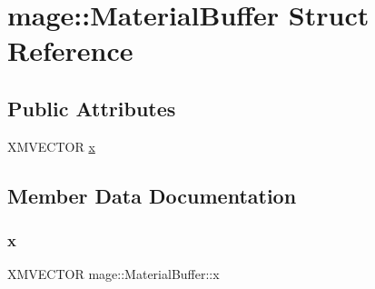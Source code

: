 \hypertarget{structmage_1_1_material_buffer}{}\section{mage\+:\+:Material\+Buffer Struct Reference}
\label{structmage_1_1_material_buffer}
\subsection*{Public Attributes}
\begin{DoxyCompactItemize}
\item 
X\+M\+V\+E\+C\+T\+OR \hyperlink{structmage_1_1_material_buffer_a0607c9c672035e585985d70e166cda92}{x}
\end{DoxyCompactItemize}


\subsection{Member Data Documentation}
\hypertarget{structmage_1_1_material_buffer_a0607c9c672035e585985d70e166cda92}{}\label{structmage_1_1_material_buffer_a0607c9c672035e585985d70e166cda92} 
\subsubsection{\texorpdfstring{x}{x}}
{\footnotesize\ttfamily X\+M\+V\+E\+C\+T\+OR mage\+::\+Material\+Buffer\+::x}

